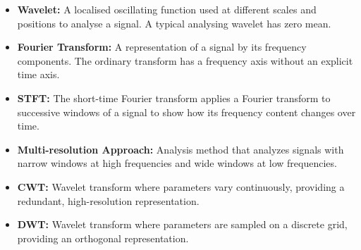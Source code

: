 \documentclass[12pt,a4paper]{article}
\begin{document}
\begin{tcolorbox}[defbox, title={\textbf{One-Line Definitions}}]
\begin{itemize}[leftmargin=*, itemsep=3.5pt]
  \item \textbf{Wavelet:} A localised oscillating function used at different scales and positions to analyse a signal. A typical analysing wavelet has zero mean.
  \item \textbf{Fourier Transform:} A representation of a signal by its frequency components. The ordinary transform has a frequency axis without an explicit time axis.
  \item \textbf{STFT:} The short-time Fourier transform applies a Fourier transform to successive windows of a signal to show how its frequency content changes over time.
  \item \textbf{Multi-resolution Approach:} Analysis method that analyzes signals with narrow windows at high frequencies and wide windows at low frequencies.
  \item \textbf{CWT:} Wavelet transform where parameters vary continuously, providing a redundant, high-resolution representation.
  \item \textbf{DWT:} Wavelet transform where parameters are sampled on a discrete grid, providing an orthogonal representation.
\end{itemize}
\end{tcolorbox}
\end{document}
